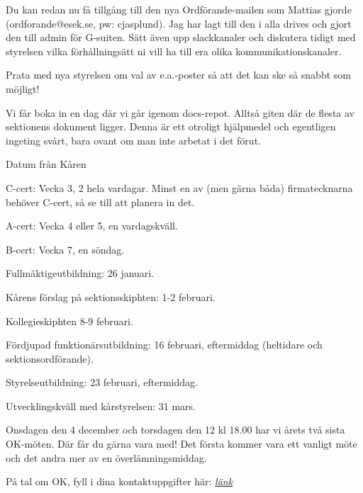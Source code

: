 \documentclass[10pt]{article}
\begin{document}
\begin{numplist}
    \item Du kan redan nu få tillgång till den nya Ordförande-mailen som Mattias gjorde (ordforande@esek.se, pw: cjasplund). Jag har lagt till den i alla drives och gjort den till admin för G-suiten. Sätt även upp slackkanaler och diskutera tidigt med styrelsen vilka förhållningsätt ni vill ha till era olika kommunikationskanaler.
    
    \item Prata med nya styrelsen om val av e.a.-poster så att det kan ske så snabbt som möjligt!

    \item Vi får boka in en dag där vi går igenom docs-repot. Alltså giten där de flesta av sektionens dokument ligger. Denna är ett otroligt hjälpmedel och egentligen ingeting svårt, bara ovant om man inte arbetat i det förut. 

   
    \item Datum från Kåren
    \begin{dashlist}
        \item C-cert: Vecka 3, 2 hela vardagar. Minst en av (men gärna båda) firmatecknarna behöver C-cert, så se till att planera in det.
        \item A-cert: Vecka 4 eller 5, en vardagskväll. 
        \item B-cert: Vecka 7, en söndag.
        \item Fullmäktigeutbildning: 26 januari.
        \item Kårens förslag på sektionsskiphten: 1-2 februari.
        \item Kollegieskiphten 8-9 februari.
        \item Fördjupad funktionärsutbildning: 16 februari, eftermiddag (heltidare och sektionsordförande).
        \item Styrelseutbildning: 23 februari, eftermiddag.
        \item Utvecklingskväll med kårstyrelsen: 31 mars.
    \end{dashlist}
    
    \item Onsdagen den 4 december och torsdagen den 12 kl 18.00 har vi årets två sista OK-möten. Där får du gärna vara med! Det första kommer vara ett vanligt möte och det andra mer av en överlämningsmiddag.
    
    \item På tal om OK, fyll i dina kontaktuppgifter här: \href{https://docs.google.com/spreadsheets/d/1Alnfo_BpbiZjzFlzi3GcLDZghKOSsQWLfhRr2DIe0F0/edit#gid=0}{\textit{länk}}


\end{numplist}
\end{document}
